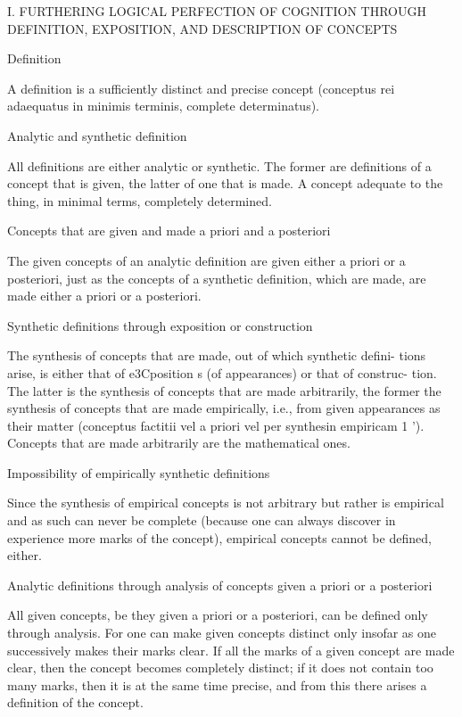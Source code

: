     I. FURTHERING LOGICAL PERFECTION OF COGNITION THROUGH
    DEFINITION, EXPOSITION, AND DESCRIPTION OF CONCEPTS

    Definition

    A definition is a sufficiently distinct and precise concept
    (conceptus rei adaequatus in minimis terminis, complete determinatus).

    Analytic and synthetic definition

    All definitions are either analytic or synthetic.
    The former are definitions of a concept that is given,
    the latter of one that is made.
    A concept adequate to the thing, in minimal terms, completely determined.

    Concepts that are given and made a priori and a posteriori

    The given concepts of an analytic definition
    are given either a priori or a posteriori,
    just as the concepts of a synthetic definition, which are made,
    are made either a priori or a posteriori.

    Synthetic definitions through exposition or construction

    The synthesis of concepts that are made, out of which synthetic defini-
    tions arise, is either that of e3Cposition s (of appearances) or that of construc-
    tion. The latter is the synthesis of concepts that are made arbitrarily, the
    former the synthesis of concepts that are made empirically, i.e., from given
    appearances as their matter (conceptus factitii vel a priori vel per synthesin
    empiricam 1 '). Concepts that are made arbitrarily are the mathematical ones.

    Impossibility of empirically synthetic definitions

    Since the synthesis of empirical concepts is not arbitrary but
    rather is empirical and as such can never be complete
    (because one can always discover in experience more marks of the concept),
    empirical concepts cannot be defined, either.

    Analytic definitions through analysis of
    concepts given a priori or a posteriori

    All given concepts, be they given a priori or a posteriori,
    can be defined only through analysis.
    For one can make given concepts distinct only insofar as
    one successively makes their marks clear.
    If all the marks of a given concept are made clear,
    then the concept becomes completely distinct;
    if it does not contain too many marks,
    then it is at the same time precise,
    and from this there arises a definition of the concept.

